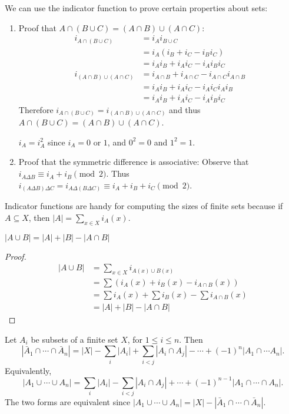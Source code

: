 \documentclass[a4paper]{article}
\begin{document}
  \begin{eg}
    We can use the indicator function to prove certain properties about sets:
    \begin{enumerate}
      \item Proof that $A\cap(B\cup C) = (A\cap B)\cup (A\cap C)$:
        \begin{align*}
          i_{A\cap (B\cup C)} &= i_Ai_{B\cup C}\\
          &= i_A(i_B + i_C - i_Bi_C)\\
          &= i_Ai_B + i_Ai_C - i_Ai_Bi_C\\
          i_{(A\cap B)\cup (A\cap C)} &= i_{A\cap B} + i_{A\cap C} - i_{A\cap C}i_{A\cap B}\\
          &= i_Ai_B + i_Ai_C - i_Ai_Ci_Ai_B\\
          &= i_Ai_B + i_Ai_C - i_Ai_Bi_C
        \end{align*}
        Therefore $i_{A\cap (B\cup C)} = i_{(A\cap B)\cup (A\cap C)}$ and thus $A\cap(B\cup C) = (A\cap B)\cup (A\cap C)$.

        \note $i_A = i_A^2$ since $i_A = 0 $ or $1$, and $0^2 = 0$ and $1^2 = 1$.
      \item Proof that the symmetric difference is associative: Observe that $i_{A\Delta B} \equiv i_A + i_B \pmod 2$. Thus $i_{(A\Delta B)\Delta C} = i_{A\Delta(B\Delta C)} \equiv i_A + i_B + i_C \pmod2$.
    \end{enumerate}
  \end{eg}
  Indicator functions are handy for computing the sizes of finite sets because if $A\subseteq X$, then $|A| = \sum\limits_{x\in X}i_A(x)$.

  \begin{prop}
    $|A\cup B| = |A| + |B| - |A\cap B|$
  \end{prop}

  \begin{proof}
    \begin{align*}
      |A\cup B| &= \sum_{x\in X} i_{A(x)\cup B(x)}\\
      &= \sum (i_A(x) + i_B(x) - i_{A\cap B}(x))\\
      &= \sum i_A(x) + \sum i_B(x) - \sum i_{A\cap B}(x)\\
      &= |A| + |B| - |A\cap B|
    \end{align*}
  \end{proof}

  \begin{thm}
    Let $A_i$ be subsets of a finite set $X$, for $1 \leq i\leq n$. Then
    \[
      |\bar A_1\cap \cdots \cap \bar A_n| = |X| - \sum_i |A_i| + \sum_{i < j}|A_i\cap A_j| -  \cdots + (-1)^n|A_1\cap \cdots A_n|.
    \]
    Equivalently, 
    \[
      |A_1\cup \cdots \cup A_n| = \sum_i|A_i| - \sum_{i < j}|A_i\cap A_j| + \cdots +(-1)^{n-1}|A_1\cap \cdots \cap A_n|.
    \]
    \note The two forms are equivalent since $|A_1\cup\cdots\cup A_n| = |X| - |\bar A_1\cap \cdots \cap \bar A_n|$.
  \end{thm}
\end{document}
